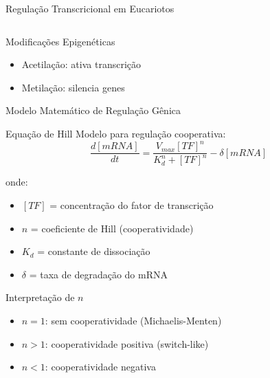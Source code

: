 \begin{frame}[shrink=15]{Regulação Transcricional em Eucariotos}
\begin{columns}
\begin{center}
\end{center}
\end{columns}

\vspace{0.3cm}

\begin{exampleblock}{Modificações Epigenéticas}
\begin{itemize}
    \item Acetilação: ativa transcrição
    \item Metilação: silencia genes
\end{itemize}
\end{exampleblock}
\end{frame}

\begin{frame}[shrink=15]{Modelo Matemático de Regulação Gênica}
\begin{block}{Equação de Hill}
Modelo para regulação cooperativa:
\begin{equation*}
\frac{d[mRNA]}{dt} = \frac{V_{max} [TF]^n}{K_d^n + [TF]^n} - \delta [mRNA]
\end{equation*}

onde:
\begin{itemize}
    \item $[TF]$ = concentração do fator de transcrição
    \item $n$ = coeficiente de Hill (cooperatividade)
    \item $K_d$ = constante de dissociação
    \item $\delta$ = taxa de degradação do mRNA
\end{itemize}
\end{block}

\vspace{0.3cm}

\begin{exampleblock}{Interpretação de $n$}
\begin{itemize}
    \item $n = 1$: sem cooperatividade (Michaelis-Menten)
    \item $n > 1$: cooperatividade positiva (switch-like)
    \item $n < 1$: cooperatividade negativa
\end{itemize}
\end{exampleblock}
\end{frame}

